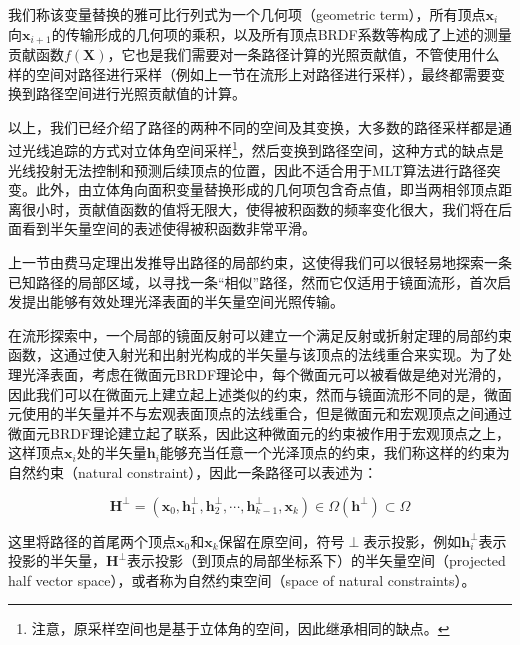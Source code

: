 \noindent 我们称该变量替换的雅可比行列式为一个几何项（geometric term），所有顶点$\mathbf{x}_i$向$\mathbf{x}_{i+1}$的传输形成的几何项的乘积，以及所有顶点BRDF系数等构成了上述的测量贡献函数$f(\mathbf{X})$，它也是我们需要对一条路径计算的光照贡献值，不管使用什么样的空间对路径进行采样（例如上一节在流形上对路径进行采样），最终都需要变换到路径空间进行光照贡献值的计算。

以上，我们已经介绍了路径的两种不同的空间及其变换，大多数的路径采样都是通过光线追踪的方式对立体角空间采样\footnote{注意，原采样空间也是基于立体角的空间，因此继承相同的缺点。}，然后变换到路径空间，这种方式的缺点是光线投射无法控制和预测后续顶点的位置，因此不适合用于MLT算法进行路径突变。此外，由立体角向面积变量替换形成的几何项包含奇点值，即当两相邻顶点距离很小时，贡献值函数的值将无限大，使得被积函数的频率变化很大，我们将在后面看到半矢量空间的表述使得被积函数非常平滑。

上一节由费马定理出发推导出路径的局部约束，这使得我们可以很轻易地探索一条已知路径的局部区域，以寻找一条“相似”路径，然而它仅适用于镜面流形，\cite{a:TheNaturalConstraintRepresentationofthePathSpaceforEfficientLightTransportSimulation}首次启发提出能够有效处理光泽表面的半矢量空间光照传输。

在流形探索中，一个局部的镜面反射可以建立一个满足反射或折射定理的局部约束函数，这通过使入射光和出射光构成的半矢量与该顶点的法线重合来实现。为了处理光泽表面，考虑在微面元BRDF理论中，每个微面元可以被看做是绝对光滑的，因此我们可以在微面元上建立起上述类似的约束，然而与镜面流形不同的是，微面元使用的半矢量并不与宏观表面顶点的法线重合，但是微面元和宏观顶点之间通过微面元BRDF理论建立起了联系，因此这种微面元的约束被作用于宏观顶点之上，这样顶点$\mathbf{x}_i$处的半矢量$\mathbf{h}_i$能够充当任意一个光泽顶点的约束，我们称这样的约束为自然约束（natural constraint），因此一条路径可以表述为：

\begin{equation}\label{e:mlt-half-vector-space}
	\mathbf{H}^{\perp}=(\mathbf{x}_0,\mathbf{h}^{\perp}_1,\mathbf{h}^{\perp}_2,\cdots,\mathbf{h}^{\perp}_{k-1},\mathbf{x}_k)\in\Omega(\mathbf{h}^{\perp})\subset\Omega
\end{equation}

\noindent 这里将路径的首尾两个顶点$\mathbf{x}_0$和$\mathbf{x}_k$保留在原空间，符号$\perp$表示投影，例如$\mathbf{h}^{\perp}_i$表示投影的半矢量，$\mathbf{H}^{\perp}$表示投影（到顶点的局部坐标系下）的半矢量空间（projected half vector space），或者称为自然约束空间（space of natural constraints）。

